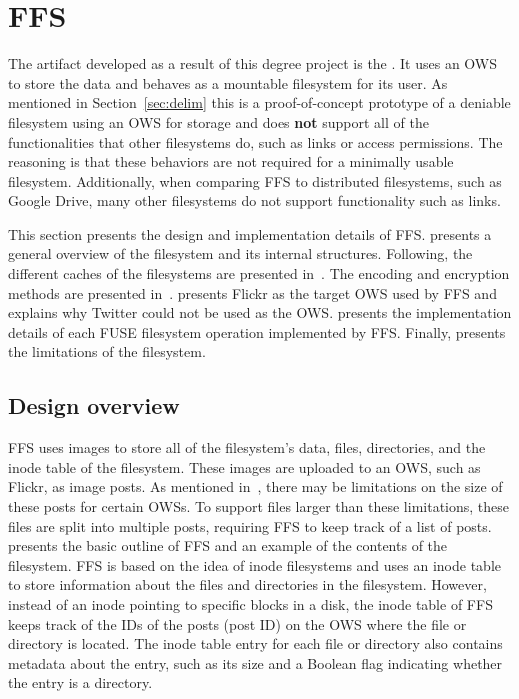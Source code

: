 \section{FFS}
\label{sec:ffs}
The artifact developed as a result of this degree project is the . It uses an \gls{OWS} to store the data and behaves as a mountable filesystem for its user. As mentioned in Section~\ref{sec:delim} this is a \mbox{proof-of-concept} prototype of a deniable filesystem using an \gls{OWS} for storage and does \textbf{not} support all of the functionalities that other filesystems do, such as links or access permissions. The reasoning is that these behaviors are not required for a minimally usable filesystem. Additionally, when comparing \gls{FFS} to distributed filesystems, such as Google Drive, many other filesystems do not support functionality such as links.

This section presents the design and implementation details of \gls{FFS}.  presents a general overview of the filesystem and its internal structures. Following, the different caches of the filesystems are presented in~. The encoding and encryption methods are presented in~.  presents Flickr as the target \gls{OWS} used by \gls{FFS} and explains why Twitter could not be used as the \gls{OWS}.  presents the implementation details of each \gls{FUSE} filesystem operation implemented by \gls{FFS}. Finally,  presents the limitations of the filesystem.

\subsection{Design overview}
\label{subsec:ffs_impl_overview}
\gls{FFS} uses images to store all of the filesystem's data, \ie files, directories, and the inode table of the filesystem. These images are uploaded to an \gls{OWS}, such as Flickr, as image posts. As mentioned in~, there may be limitations on the size of these posts for certain \glspl{OWS}. To support files larger than these limitations, these files are split into multiple posts, requiring \gls{FFS} to keep track of a list of posts.  presents the basic outline of \gls{FFS} and an example of the contents of the filesystem. \gls{FFS} is based on the idea of inode filesystems and uses an inode table to store information about the files and directories in the filesystem. However, instead of an inode pointing to specific blocks in a disk, the inode table of \gls{FFS} keeps track of the IDs of the posts (\ie post ID) on the \gls{OWS} where the file or directory is located. The inode table entry for each file or directory also contains metadata about the entry, such as its size and a Boolean flag indicating whether the entry is a directory.

